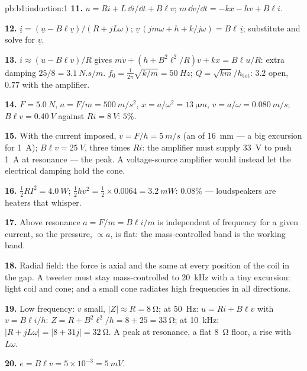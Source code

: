 \begin{solution}{pb:b1:induction:1}
\textbf{11.} $u = Ri + L\,\dd i/\dd t + B\ell v$; $m\,\dd v/\dd t = -kx - hv + B\ell i$.

\textbf{12.} $\underline i = (\underline u - B\ell\underline v)/(R + jL\omega)$; $\underline v\,(jm\omega + h +
k/j\omega) = B\ell\,\underline i$; substitute and solve for $\underline v$.

\textbf{13.} $i \approx (u - B\ell v)/R$ gives $m\dot v + (h + B^2\ell^2/R)v + kx =
B\ell u/R$: extra damping $25/8 = \qty{3.1}{N.s/m}$. $f_0 = \tfrac1{2\pi}\sqrt{k/m} =
\qty{50}{Hz}$; $Q = \sqrt{km}/h_{\text{tot}}$: $3.2$ open, $0.77$ with the
amplifier.

\textbf{14.} $F = \qty{5.0}{N}$, $a = F/m = \qty{500}{m/s^2}$, $x = a/\omega^2 =
\qty{13}{\micro m}$, $v = a/\omega = \qty{0.080}{m/s}$; $B\ell v = \qty{0.40}{V}$ against
$Ri = \qty{8}{V}$: $5\%$.

\textbf{15.} With the current imposed, $v = F/h = \qty{5}{m/s}$ (an
 of \qty{16}{mm} --- a big excursion for \qty{1}{A}); $B\ell v =
\qty{25}{V}$, three times $Ri$: the amplifier must supply \qty{33}{V} to push
\qty{1}{A} at resonance --- the  peak. A voltage-source amplifier
would instead let the electrical damping hold the cone.

\textbf{16.} $\tfrac12RI^2 = \qty{4.0}{W}$; $\tfrac12hv^2 = \tfrac12 \times 0.0064 =
\qty{3.2}{mW}$:  $0.08\%$ --- loudspeakers are heaters that
whisper.

\textbf{17.} Above resonance $a = F/m = B\ell i/m$ is independent of
frequency for a given current, so the pressure, $\propto a$, is flat:
the mass-controlled band is the working band.

\textbf{18.} Radial field: the force is axial and the same at every
position of the coil in the gap. A tweeter must stay mass-controlled
to \qty{20}{kHz} with a tiny excursion: light coil and cone; and a
small cone radiates high frequencies in all directions.

\textbf{19.} Low frequency: $v$ small, $|Z| \approx R = \qty{8}{\ohm}$; at
\qty{50}{Hz}: $u = Ri + B\ell v$ with $v = B\ell i/h$: $Z = R + B^2\ell^2/h = 8 + 25 =
\qty{33}{\ohm}$; at \qty{10}{kHz}: $|R + jL\omega| = |8 + 31j| = \qty{32}{\ohm}$. A
peak at resonance, a flat \qty{8}{\ohm} floor, a rise with $L\omega$.

\textbf{20.} $e = B\ell v = 5 \times 10^{-3} = \qty{5}{mV}$.


\end{solution}
